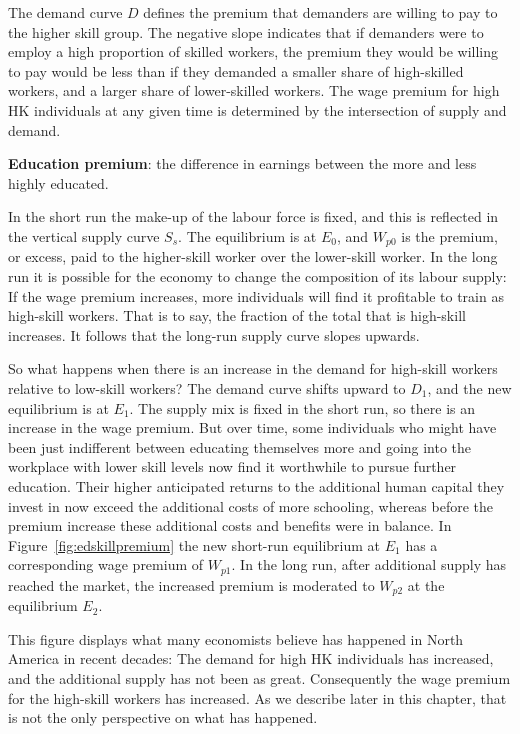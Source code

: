 

\newhtmlpage

The demand curve $D$ defines the premium that demanders are willing to pay
to the higher skill group. The negative slope indicates that if demanders
were to employ a high proportion of skilled workers, the premium they would
be willing to pay would be less than if they demanded a smaller share of
high-skilled workers, and a larger share of lower-skilled workers. The wage
premium for high HK individuals at any given time is determined by the
intersection of supply and demand. 

\begin{DefBox}
	\textbf{Education premium}: the difference in earnings between the more and less highly educated.
\end{DefBox}

In the short run the make-up of the labour force is fixed, and this is
reflected in the vertical supply curve $S_s$. The equilibrium is at $E_0$,
and $W_{p0}$ is the premium, or excess, paid to the higher-skill worker over
the lower-skill worker. In the long run it is possible for the economy to
change the composition of its labour supply: If the wage premium increases,
more individuals will find it profitable to train as high-skill workers.
That is to say, the fraction of the total that is high-skill increases. It
follows that the long-run supply curve slopes upwards.

So what happens when there is an increase in the demand for high-skill
workers relative to low-skill workers? The demand curve shifts upward to 
$D_{1}$, and the new equilibrium is at $E_{1}$. The supply mix is fixed in
the short run, so there is an increase in the wage premium. But over time,
some individuals who might have been just indifferent between educating
themselves more and going into the workplace with lower skill levels now
find it worthwhile to pursue further education. Their higher anticipated
returns to the additional human capital they invest in now exceed the
additional costs of more schooling, whereas before the premium increase
these additional costs and benefits were in balance. In Figure~\ref{fig:edskillpremium}
the new short-run equilibrium at $E_{1}$ has a
corresponding wage premium of $W_{p1}$. In the long run, after additional
supply has reached the market, the increased premium is moderated to $W_{p2}$
at the equilibrium $E_{2}$. 

This figure displays what many economists believe has happened in North
America in recent decades: The demand for high HK individuals has increased,
and the additional supply has not been as great. Consequently the wage
premium for the high-skill workers has increased. As we describe later in
this chapter, that is not the only perspective on what has happened.

